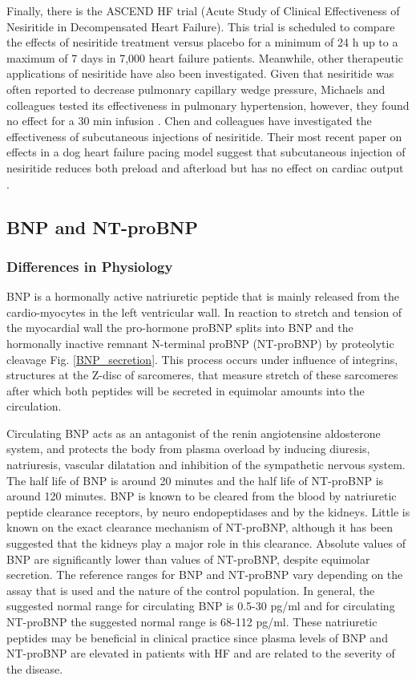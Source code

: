 \documentclass[14pt,a4paper,onecolumn]{extarticle}
\begin{document}
Finally, there is the ASCEND HF trial (Acute Study of Clinical Effectiveness of Nesiritide in Decompensated Heart Failure). This trial is scheduled to compare the effects of nesiritide treatment versus placebo for a minimum of 24 h up to a maximum of 7 days in 7,000 heart failure patients. Meanwhile, other therapeutic applications of nesiritide have also been investigated. Given that nesiritide was often reported to decrease pulmonary capillary wedge pressure, Michaels and colleagues tested its effectiveness in pulmonary hypertension, however, they found no effect for a 30 min infusion \citep{Michaels2005}. Chen and colleagues have investigated the effectiveness of subcutaneous injections of nesiritide. Their most recent paper on effects in a dog heart failure pacing model suggest that subcutaneous injection of nesiritide reduces both preload and afterload but has no effect on cardiac output \citep{Chen2006}.

\subsection{BNP and NT-proBNP}
\subsubsection{Differences in Physiology}
BNP is a hormonally active natriuretic peptide that is mainly released from the cardio-myocytes in the left ventricular wall. In reaction to stretch and tension of the myocardial wall the pro-hormone proBNP splits into BNP and the hormonally inactive remnant N-terminal proBNP (NT-proBNP) by proteolytic cleavage Fig. \ref{BNP_secretion}. \citep{Pfister2004} This process occurs under influence of integrins, structures at the Z-disc of sarcomeres, that measure stretch of these sarcomeres \citep{Liang2000,Pyle2004} after which both peptides will be secreted in equimolar amounts into the circulation.

Circulating BNP acts as an antagonist of the renin angiotensine aldosterone system, and protects the body from plasma overload by inducing diuresis, natriuresis, vascular dilatation and inhibition of the sympathetic nervous system. \citep{Sudoh1988} The half life of BNP is around 20 minutes and the half life of NT-proBNP is around 120 minutes. BNP is known to be cleared from the blood by natriuretic peptide clearance receptors, by neuro endopeptidases and by the kidneys. Little is known on the exact clearance mechanism of NT-proBNP, although it has been suggested that the kidneys play a major role in this clearance. \citep{Hall2005}
Absolute values of BNP are significantly lower than values of NT-proBNP, despite equimolar secretion. The reference ranges for BNP and NT-proBNP vary depending on the assay that is used and the nature of the control population. In general, the suggested normal range for circulating BNP is 0.5-30 pg/ml and for circulating NT-proBNP the suggested normal range is 68-112 pg/ml. \citep{Cowie2003} These natriuretic peptides may be beneficial in clinical practice since plasma levels of BNP and NT-proBNP are elevated in patients with HF and are related to the severity of the disease. \citep{Mukoyama1990}
\end{document}
